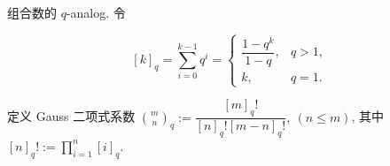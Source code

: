 组合数的 \(q\)-analog. 令

\[
    [k]_q=\sum_{i=0}^{k-1}q^i=\begin{cases}
        \dfrac{1-q^k}{1-q},&q>1,\\
        k,&q=1.
    \end{cases}
\]

定义 Gauss 二项式系数 \(\binom{m}{n}_q:=\dfrac{[m]_q!}{[n]_q![m-n]_q!},~(n\leq m)\), 其中 \([n]_q!:=\prod_{i=1}^n [i]_q\).